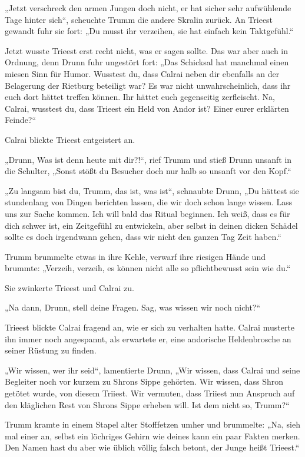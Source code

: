„Jetzt verschreck den armen Jungen doch nicht, er hat sicher sehr aufwühlende Tage hinter sich“, scheuchte Trumm die andere Skralin zurück. An Trieest gewandt fuhr sie fort: „Du musst ihr verzeihen, sie hat einfach kein Taktgefühl.“

Jetzt wusste Trieest erst recht nicht, was er sagen sollte. Das war aber auch in Ordnung, denn Drunn fuhr ungestört fort: „Das Schicksal hat manchmal einen miesen Sinn für Humor. Wusstest du, dass Calrai neben dir ebenfalls an der Belagerung der Rietburg beteiligt war? Es war nicht unwahrscheinlich, dass ihr euch dort hättet treffen können. Ihr hättet euch gegenseitig zerfleischt. Na, Calrai, wusstest du, dass Trieest ein Held von Andor ist? Einer eurer erklärten Feinde?“

Calrai blickte Trieest entgeistert an.

„Drunn, Was ist denn heute mit dir?!“, rief Trumm und stieß Drunn unsanft in die Schulter, „Sonst stößt du Besucher doch nur halb so unsanft vor den Kopf.“

„Zu langsam bist du, Trumm, das ist, was ist“, schnaubte Drunn, „Du hättest sie stundenlang von Dingen berichten lassen, die wir doch schon lange wissen. Lass uns zur Sache kommen. Ich will bald das Ritual beginnen. Ich weiß, dass es für dich schwer ist, ein Zeitgefühl zu entwickeln, aber selbst in deinen dicken Schädel sollte es doch irgendwann gehen, dass wir nicht den ganzen Tag Zeit haben.“

Trumm brummelte etwas in ihre Kehle, verwarf ihre riesigen Hände und brummte: „Verzeih, verzeih, es können nicht alle so pflichtbewusst sein wie du.“

Sie zwinkerte Trieest und Calrai zu.

„Na dann, Drunn, stell deine Fragen. Sag, was wissen wir noch nicht?“

Trieest blickte Calrai fragend an, wie er sich zu verhalten hatte. Calrai musterte ihn immer noch angespannt, als erwartete er, eine andorische Heldenbrosche an seiner Rüstung zu finden.

„Wir wissen, wer ihr seid“, lamentierte Drunn, „Wir wissen, dass Calrai und seine Begleiter noch vor kurzem zu Shrons Sippe gehörten. Wir wissen, dass Shron getötet wurde, von diesem Triiest. Wir vermuten, dass Triiest nun Anspruch auf den kläglichen Rest von Shrons Sippe erheben will. Ist dem nicht so, Trumm?“

Trumm kramte in einem Stapel alter Stofffetzen umher und brummelte: „Na, sieh mal einer an, selbst ein löchriges Gehirn wie deines kann ein paar Fakten merken. Den Namen hast du aber wie üblich völlig falsch betont, der Junge heißt Trieest.“

